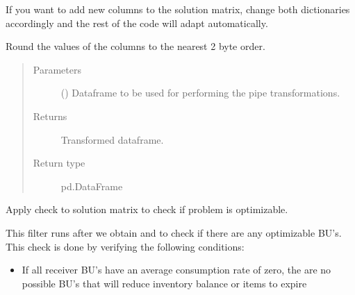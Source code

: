 \documentclass[letterpaper,10pt,english]{sphinxmanual}
\begin{document}
\begin{fulllineitems}
\begin{fulllineitems}
If you want to add new columns to the solution matrix, change both dictionaries accordingly
and the rest of the code will adapt automatically.



\end{fulllineitems}


\begin{fulllineitems}
\label{\detokenize{source/optimization:optimization.solspace.SolutionSpace._rounding_columns}}
Round the values of the columns to the nearest 2 \sphinxhyphen{} byte order.
\begin{quote}\begin{description}
\item[{Parameters}] \leavevmode
{} () \textendash{} Dataframe to be used for performing the pipe transformations.

\item[{Returns}] \leavevmode
{} \textendash{} Transformed dataframe.

\item[{Return type}] \leavevmode
pd.DataFrame

\end{description}\end{quote}

\end{fulllineitems}


\begin{fulllineitems}
\label{\detokenize{source/optimization:optimization.solspace.SolutionSpace.filter_matrix}}
Apply check to solution matrix to check if problem is optimizable.

This filter runs after we obtain  and  to check if there
are any optimizable BU’s. This check is done by verifying the following conditions:
\begin{itemize}
\item {} 
 \sphinxhyphen{} If all receiver BU’s have an average consumption rate of zero, the are no possible BU’s that will reduce inventory balance or items to expire


\end{itemize}
\end{fulllineitems}
\end{fulllineitems}
\end{document}
